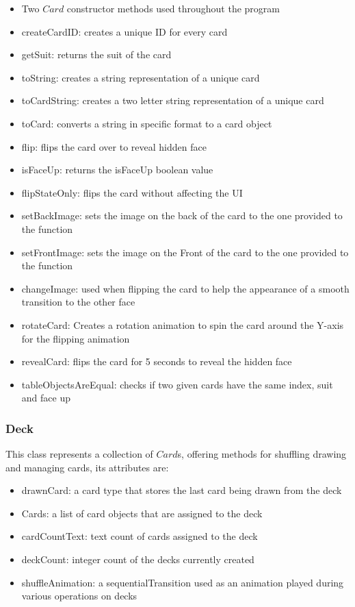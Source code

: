 \documentclass[a4paper]{project}
\begin{document}
				\begin{itemize}
					\item Two $Card$ constructor methods used throughout the program
					\item createCardID: creates a unique ID for every card
					\item getSuit: returns the suit of the card
					\item toString: creates a string representation of a unique card
					\item toCardString: creates a two letter string representation of a unique card
					\item toCard: converts a string in specific format to a card object
					\item flip: flips the card over to reveal hidden face
					\item isFaceUp: returns the isFaceUp boolean value
					\item flipStateOnly: flips the card without affecting the UI
					\item setBackImage: sets the image on the back of the card to the one provided to the function
					\item setFrontImage: sets the image on the Front of the card to the one provided to the function
					\item changeImage: used when flipping the card to help the appearance of a smooth transition to the other face
					\item rotateCard: Creates a rotation animation to spin the card around the Y-axis for the flipping animation
					\item revealCard: flips the card for 5 seconds to reveal the hidden face
					\item tableObjectsAreEqual: checks if two given cards have the same index, suit and face up
				\end{itemize}
				
			\subsubsection{Deck}\label{subsubsec:deck}
				
				This class represents a collection of $Card$s, offering methods for shuffling drawing and managing cards, its attributes are:
				
				\begin{itemize}
					\item drawnCard: a card type that stores the last card being drawn from the deck
					\item Cards: a list of card objects that are assigned to the deck
					\item cardCountText: text count of cards assigned to the deck
					\item deckCount: integer count of the decks currently created
					\item shuffleAnimation: a sequentialTransition used as an animation played during various operations on decks
				\end{itemize}
				
\end{document}
